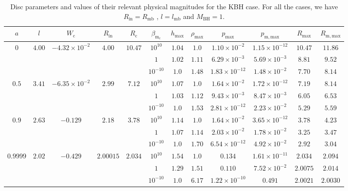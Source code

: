 \documentclass[twocolumn,aps,showpacs,showkeys,prd,superscriptaddress,byrevtex, amsmath]{revtex4-1}
\begin{document}
\begin{table}[t]
\caption{Disc parameters and values of their relevant physical magnitudes for the KBH case. For all the cases, we have $R_{\mathrm{in}} = R_{\mathrm{mb}}$ , $l = l_{\mathrm{mb}}$ and $M_{\mathrm{BH}} = 1$.}        
\label{KBH_disk_parameters}      
\centering          
\begin{tabular}{c c c c c  c c c c c c c}
\hline\hline       
 $a$ & $l$ & $W_{\mathrm{c}}$ & $R_{\mathrm{in}}$ & $R_{\mathrm{c}}$ &  $\beta_{\mathrm{m_{\mathrm{c}}}}$ & $h_{\mathrm{max}}$ & $\rho_{\mathrm{max}}$ & $p_{\mathrm{max}}$ & $p_{\mathrm{m, max}}$ & $R_{\mathrm{max}}$ & $R_{\mathrm{m, max}}$\\ 
\hline           
$0$ & $4.00$ & $-4.32 \times 10^{-2}$ & $4.00$ & $10.47$ & $10^{10}$ & $1.04$ & $1.0$ & $1.10 \times 10^{-2}$ & $1.15 \times 10^{-12}$ & $10.47$ & $11.86$\\ 
 \hline 
 &  &  &  &  & $1$ & $1.02$ & $1.11$ & $6.29 \times 10^{-3}$ & $5.69 \times 10^{-3}$ & $8.81$ & $9.52$\\ 
 \hline 
 &  &  &  &  & $10^{-10}$ & $1.0$ & $1.48$ & $1.83 \times 10^{-12}$ & $1.48 \times 10^{-2}$ & $7.70$ & $8.14$\\ 
 \hline 
 $0.5$ & $3.41$ & $-6.35 \times 10^{-2}$ & $2.99$ & $7.12$ & $10^{10}$ & $1.07$ & $1.0$ & $1.64 \times 10^{-2}$ & $1.72 \times 10^{-12}$ & $7.19$ & $8.14$\\ 
 \hline 
 &  &  &  &  & $1$ & $1.03$ & $1.12$ & $9.43 \times 10^{-3}$ & $8.47 \times 10^{-3}$ & $6.05$ & $6.53$ \\ 
 \hline 
 &  &  &  &  & $10^{-10}$ & $1.0$ & $1.53$ & $2.81 \times 10^{-12}$ & $2.23 \times 10^{-2}$ & $5.29$ & $5.59$\\ 
\hline  
$0.9$ & $2.63$ & $-0.129$ & $2.18$ & $3.78$ & $10^{10}$ & $1.14$ & $1.0$ & $1.64 \times 10^{-2}$ & $3.65 \times 10^{-12}$ & $3.78$ & $4.23$\\ 
 \hline 
 &  &  &  &  & $1$ & $1.07$ & $1.14$ & $2.03 \times 10^{-2}$ & $1.78 \times 10^{-2}$ & $3.25$ & $3.47$\\ 
 \hline 
 &  &  &  &  & $10^{-10}$ & $1.0$ & $1.70$ & $6.54 \times 10^{-12}$ & $4.92 \times 10^{-2}$ & $2.92$ & $3.04$ \\ 
 \hline 
$0.9999$ & $2.02$ & $-0.429$ & $2.00015$ & $2.034$ & $10^{10}$ & $1.54$ & $1.0$ & $0.134$ & $1.61 \times 10^{-11}$ & $2.034$ & $2.094$ \\ 
\hline 
 &  &  &  &  & $1$ & $1.29$ & $1.51$ & $0.110$ & $7.52 \times 10^{-2}$ & $2.0075$ & $2.014$\\ 
\hline 
 &  &  &  &  & $10^{-10}$ & $1.0$ & $6.17$ & $1.22 \times 10^{-10}$ & $0.491$ & $2.0021$ & $2.0030$ \\ 
\hline   
\end{tabular}
\end{table}
\end{document}
